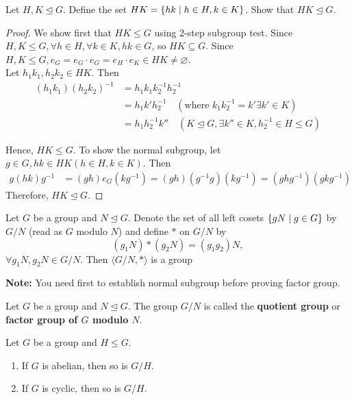 \begin{exercise}
    Let $H, K \unlhd G$. Define the set $HK = \qty{hk \mid h \in H, k \in K}$. Show that $HK \unlhd G$.
\end{exercise}

\begin{proof}
    We show first that $HK \leq G$ using 2-step subgroup test. Since $H, K \leq G, \forall h \in H, \forall k \in K, hk \in G$, so $HK \subseteq G$. Since $H, K \leq G, e_G = e_G \cdot e_G = e_H \cdot e_K \in HK \neq \varnothing$. \\
    
    Let $h_1k_1, h_2k_2 \in HK$. Then
    \begin{align*}
        (h_1k_1)(h_2k_2)^{-1} &= h_1k_1k_2^{-1}h_2^{-1} \\
        &= h_1k'h_2^{-1} \hspace{1em} (\text{where } k_1k_2^{-1} = k' \exists k' \in K) \\
        &= h_1h_2^{-1}k'' \hspace{1em} (K \unlhd G, \exists k'' \in K, h_2^{-1} \in H \leq G)
    \end{align*}
     
    Hence, $HK \leq G$. To show the normal subgroup, let $g \in G, hk \in HK (h \in H, k \in K)$. Then
    \begin{align*}
        g(hk)g^{-1} &= (gh)e_G(kg^{-1})=(gh)(g^{-1}g)(kg^{-1}) = (ghg^{-1})(gkg^{-1})
    \end{align*}
    Therefore, $HK \unlhd G$.\qedsymbol
\end{proof}

\begin{theorem}
    Let $G$ be a group and $N \unlhd G$. Denote the set of all left cosets $\qty{gN \mid g \in G}$ by $G / N$ (read as $G$ modulo $N$) and define $\ast$ on $G / N$ by
    \[ (g_1N) \ast (g_2N) = (g_1g_2)N, \]
    $\forall g_1N, g_2N \in G / N$. Then $\langle G / N, \ast \rangle$ is a group
\end{theorem}

\textbf{Note:} You need first to establish normal subgroup before proving factor group.

\begin{definition}
    Let $G$ be a group and $N \unlhd G$. The group $G / N$ is called the \textbf{quotient group} or \textbf{factor group of $G$ modulo $N$}. 
\end{definition}

\begin{theorem}
    Let $G$ be a group and $H \leq G$.
    \begin{enumerate}
        \item If $G$ is abelian, then so is $G / H$.
        \item If $G$ is cyclic, then so is $G / H$.
    \end{enumerate}
\end{theorem}

